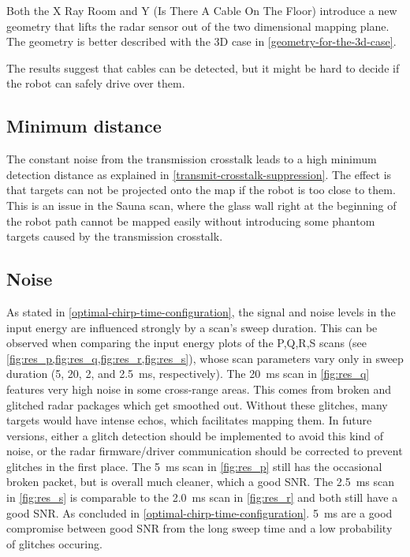 Both the X Ray Room and Y (Is There A Cable On The Floor) introduce a
new geometry that lifts the radar sensor out of the two dimensional
mapping plane. The geometry is better described with the 3D case in \cref{geometry-for-the-3d-case}.

The results suggest that cables can be detected, but it might be hard to decide if the robot can safely drive over them.

\subsection{Minimum distance}\label{minimum-distance}

The constant noise from the transmission crosstalk leads to a high
minimum detection distance as explained in \cref{transmit-crosstalk-suppression}. The effect is that
targets can not be projected onto the map if the robot is too close to
them. This is an issue in the Sauna scan, where the glass wall right at
the beginning of the robot path cannot be mapped easily without introducing some phantom targets caused by the transmission crosstalk.

\subsection{Noise} \label{noise}
As stated in \cref{optimal-chirp-time-configuration}, the signal and noise levels in the input energy are influenced strongly by a scan's sweep duration. This can be observed when comparing the input energy plots of the P,Q,R,S scans (see \cref{fig:res_p,fig:res_q,fig:res_r,fig:res_s}), whose scan parameters vary only in sweep duration (5, 20, 2, and \SI{2.5}{ms}, respectively). The \SI{20}{ms} scan in \cref{fig:res_q} features very high noise in some cross-range areas. This comes from broken and glitched radar packages which get smoothed out. Without these glitches, many targets would have intense echos, which facilitates mapping them. In future versions, either a glitch detection should be implemented to avoid this kind of noise, or the radar firmware/driver communication should be corrected to prevent glitches in the first place. The \SI{5}{ms} scan in \cref{fig:res_p} still has the occasional broken packet, but is overall much cleaner, which a good SNR. The \SI{2.5}{ms} scan in \cref{fig:res_s} is comparable to the \SI{2.0}{ms} scan in \cref{fig:res_r} and both still have a good SNR. As concluded in \cref{optimal-chirp-time-configuration}. \SI{5}{ms} are a good compromise between good SNR from the long sweep time and a low probability of glitches occuring.

